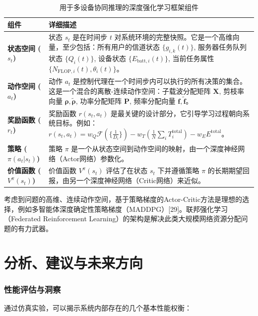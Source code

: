 \documentclass[11pt, a4paper]{article}
\begin{document}
\begin{table}[h!]
\centering
\caption{用于多设备协同推理的深度强化学习框架组件}
\label{tab:drl_framework}
\begin{tabular}{lp{}}
\toprule
\textbf{组件} & \textbf{详细描述} \\
\midrule
\textbf{状态空间 ($s_t$)} & 状态 $s_t$ 是在时间步 $t$ 对系统环境的完整快照。它是一个高维向量，至少包括：所有用户的信道状态 $\{g_{i,k}(t)\}$, 服务器任务队列状态 $\{Q_i(t)\}$, 设备状态 $\{E_{\text{batt},i}(t)\}$, 当前任务属性 $\{N_{\text{FLOP},i}(t), \theta_i(t)\}$。 \\
\addlinespace
\textbf{动作空间 ($a_t$)} & 动作 $a_t$ 是控制代理在一个时间步内可以执行的所有决策的集合。这是一个混合的离散-连续动作空间：子载波分配矩阵 $\mathbf{X}$, 剪枝率向量 $\mathbf{\rho}, \tilde{\mathbf{\rho}}$, 功率分配矩阵 $\mathbf{P}$, 频率分配向量 $\mathbf{f}, \tilde{\mathbf{f}}$。 \\
\addlinespace
\textbf{奖励函数 ($r_t$)} & 奖励函数 $r(s_t, a_t)$ 是最关键的设计部分，它引导学习过程朝向系统目标。例如：$r(s_t, a_t) = w_Q \mathcal{F}(\{\frac{1}{D_i}\}) - w_T (\frac{1}{N}\sum_i T_i^{\text{total}}) - w_E E^{\text{total}}$。 \\
\addlinespace
\textbf{策略 ($\pi(a_t|s_t)$)} & 策略 $\pi$ 是一个从状态空间到动作空间的映射，由一个深度神经网络（Actor网络）参数化。 \\
\addlinespace
\textbf{价值函数 ($V^\pi(s_t)$)} & 价值函数 $V^\pi(s_t)$ 评估了在状态 $s_t$ 下并遵循策略 $\pi$ 的长期期望回报，由另一个深度神经网络（Critic网络）来近似。 \\
\bottomrule
\end{tabular}
\end{table}

考虑到问题的高维、连续动作空间，基于策略梯度的Actor-Critic方法是理想的选择，例如多智能体深度确定性策略梯度（MADDPG）[29]。联邦强化学习（Federated Reinforcement Learning）的架构是解决此类大规模网络资源分配问题的有力武器。

\part{分析、建议与未来方向}

\section{性能评估与洞察}

通过仿真实验，可以揭示系统内部存在的几个基本性能权衡：
\end{document}

